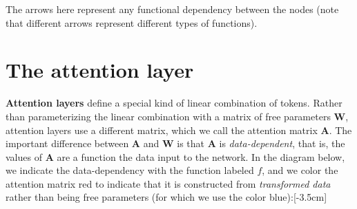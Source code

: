 The arrows here represent any functional dependency between the nodes (note that different arrows represent different types of functions).


\section{The attention layer}
\textbf{Attention layers} define a special kind of linear combination of tokens. Rather than parameterizing the linear combination with a matrix of free parameters $\mathbf{W}$, attention layers use a different matrix, which we call the attention matrix $\mathbf{A}$. The important difference between $\mathbf{A}$ and $\mathbf{W}$ is that $\mathbf{A}$ is \textit{data-dependent}, that is, the values of $\mathbf{A}$ are a function the data input to the network. In the diagram below, we indicate the data-dependency with the function labeled $f$, and we color the attention matrix red to indicate that it is constructed from \textit{transformed data} rather than being free parameters (for which we use the color blue):[-3.5cm]
